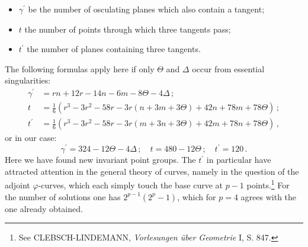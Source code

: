 \documentclass[leqno]{article}
\begin{document}
\begin{itemize}[label={}]
	\item $ \gamma^\prime $ be the number of osculating planes which also contain a tangent;
	\item $ t $ the number of points through which three tangents pass;
	\item $ t^\prime $ the number of planes containing three tangents.
\end{itemize}
The following formulas apply here if only $ \Theta $ and $ \Delta$ occur from essential singularities:
\begin{align*}
	\gamma^\prime &= rn + 12r - 14n - 6m - 8\Theta - 4\Delta  \, ; \\
	t &= \frac{1}{6}\left(r^3 - 3r^2 - 58r - 3r \left(n + 3m + 3\Theta \right) +42n + 78m + 78\Theta \right) \, ; \\
	t^\prime &= \frac{1}{6} \left(r^3 - 3r^2 - 58r - 3r \left(m + 3n + 3\Theta \right)+42m + 78n + 78\Theta\right) \, , 
\end{align*}
or in our case:
\[
\gamma^\prime = 324 - 12\Theta - 4\Delta \, ; \quad t=480-12\Theta \, ; \quad t^\prime = 120 \, . 
\]
Here we have found new invariant point groups. The $ t^\prime $ in particular have attracted attention in the general theory of curves, namely in the question of the adjoint $ \varphi$-curves, which each simply touch the base curve at $ p-1 $ points.\footnote{See CLEBSCH-LINDEMANN, \textit{Vorlesungen \"uber Geometrie} I, S. 847.} For the number of solutions one has $ 2^{p-1} (2^p-1) $, which for $ p = 4 $ agrees with the one already obtained.
\end{document}
